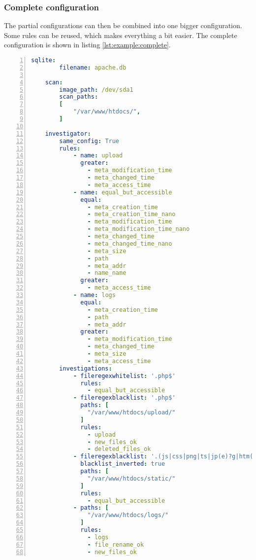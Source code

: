\subsubsection{Complete configuration}

The partial configurations can then be combined into one bigger configuration. Some rules can be reused, which makes everything a bit easier. The complete configuration is shown in listing \ref{lst:example:complete}.

\begin{lstlisting}[language=yaml, numbers=left, caption=Complete Example Configuration, label=lst:example:complete]
    sqlite:
        filename: apache.db
    
    scan:
        image_path: /dev/sda1
        scan_paths: 
        [
            "/var/www/htdocs/",
        ]

    investigator:
        same_config: True
        rules: 
            - name: upload
              greater:
                - meta_modification_time
                - meta_changed_time
                - meta_access_time
            - name: equal_but_accessible
              equal:
                - meta_creation_time
                - meta_creation_time_nano
                - meta_modification_time
                - meta_modification_time_nano
                - meta_changed_time
                - meta_changed_time_nano
                - meta_size
                - path
                - meta_addr
                - name_name
              greater:
                - meta_access_time
            - name: logs
              equal:
                - meta_creation_time
                - path
                - meta_addr
              greater:
                - meta_modification_time
                - meta_changed_time
                - meta_size
                - meta_access_time
        investigations:
            - fileregexwhitelist: '.php$'
              rules:
                - equal_but_accessible
            - fileregexblacklist: '.php$'
              paths: [
                "/var/www/htdocs/upload/"
              ]
              rules:
                - upload
                - new_files_ok
                - deleted_files_ok
            - fileregexblacklist: '.(js|css|png|ts|jp(e)?g|htm(l)?)$'
              blacklist_inverted: true
              paths: [
                "/var/www/htdocs/static/"
              ]
              rules:
                - equal_but_accessible
            - paths: [
                "/var/www/htdocs/logs/"
              ]
              rules:
                - logs
                - file_rename_ok
                - new_files_ok

\end{lstlisting}

